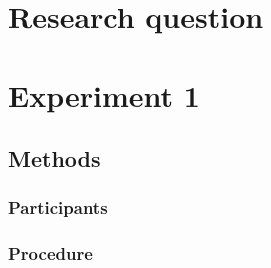\documentclass[11pt]{article}
\begin{document}
\clearpage 
\section{Research question}
\label{sec:research_question}

\section{Experiment 1}
\label{sec:experiment_1}

\subsection{Methods}
\label{sub:methods}

\subsubsection{Participants}
\label{ssub:participants}

\subsubsection{Procedure}
\label{ssub:procedure}
\end{document}
